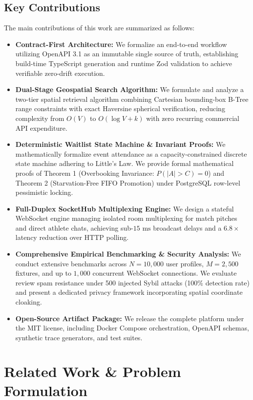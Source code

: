 \documentclass[conference]{IEEEtran}
\begin{document}
\subsection{Key Contributions}
The main contributions of this work are summarized as follows:
\begin{itemize}
    \item \textbf{Contract-First Architecture:} We formalize an end-to-end workflow utilizing OpenAPI 3.1 as an immutable single source of truth, establishing build-time TypeScript generation and runtime Zod validation to achieve verifiable zero-drift execution.
    \item \textbf{Dual-Stage Geospatial Search Algorithm:} We formulate and analyze a two-tier spatial retrieval algorithm combining Cartesian bounding-box B-Tree range constraints with exact Haversine spherical verification, reducing complexity from $O(V)$ to $O(\log V + k)$ with zero recurring commercial API expenditure.
    \item \textbf{Deterministic Waitlist State Machine \& Invariant Proofs:} We mathematically formalize event attendance as a capacity-constrained discrete state machine adhering to Little's Law. We provide formal mathematical proofs of Theorem 1 (Overbooking Invariance: $P(|A| > C) = 0$) and Theorem 2 (Starvation-Free FIFO Promotion) under PostgreSQL row-level pessimistic locking.
    \item \textbf{Full-Duplex SocketHub Multiplexing Engine:} We design a stateful WebSocket engine managing isolated room multiplexing for match pitches and direct athlete chats, achieving sub-$15\text{ ms}$ broadcast delays and a $6.8\times$ latency reduction over HTTP polling.
    \item \textbf{Comprehensive Empirical Benchmarking \& Security Analysis:} We conduct extensive benchmarks across $N = 10,000$ user profiles, $M = 2,500$ fixtures, and up to $1,000$ concurrent WebSocket connections. We evaluate review spam resistance under 500 injected Sybil attacks (100\% detection rate) and present a dedicated privacy framework incorporating spatial coordinate cloaking.
    \item \textbf{Open-Source Artifact Package:} We release the complete platform under the MIT license, including Docker Compose orchestration, OpenAPI schemas, synthetic trace generators, and test suites.
\end{itemize}

\section{Related Work \& Problem Formulation}
\end{document}
